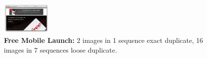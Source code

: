 \documentclass{acm_proc_article-sp}
\newcommand{\thumbheight}{16mm}
\newenvironment{thumbsequence}{}{\makebox[4mm]{}}
\begin{document}
\begin{figure}
\begin{centering}
\begin{thumbsequence}
		\includegraphics[height=\thumbheight]{resources/free/looseduplicate16.png}
	\end{thumbsequence}
	\caption{\textbf{Free Mobile Launch:} 2 images in 1 sequence exact duplicate, 16 images in 7 sequences loose duplicate.}
	\label{fig:freemobile}
\end{centering}
\end{figure}
\end{document}
